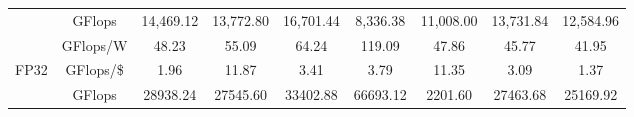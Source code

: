 \begin{table}[H]
\begin{adjustwidth}{-1.0in}{-1.0in}
\begin{center}
{\begin{tabular}{cc||c|c|c|c|c|c|c}
                                  & \cellcolor[HTML]{EFEFEF}GFlops                                                         & \cellcolor[HTML]{EFEFEF}14,469.12                               & \cellcolor[HTML]{EFEFEF}13,772.80                                & \cellcolor[HTML]{EFEFEF}16,701.44                                    & \cellcolor[HTML]{EFEFEF}8,336.38                              & \cellcolor[HTML]{EFEFEF}11,008.00                                    & \cellcolor[HTML]{EFEFEF}13,731.84                                      & \cellcolor[HTML]{EFEFEF}12,584.96                                      \\
                                  & GFlops/W                                                                               & 48.23                                                           & 55.09                                                            & 64.24                                                                & 119.09                                                        & 47.86                                                                & 45.77                                                                  & 41.95                                                                  \\
\multirow{-3}{*}{FP32}            & \cellcolor[HTML]{EFEFEF}GFlops/\$                                                      & \cellcolor[HTML]{EFEFEF}1.96                                    & \cellcolor[HTML]{EFEFEF}11.87                                    & \cellcolor[HTML]{EFEFEF}3.41                                         & \cellcolor[HTML]{EFEFEF}3.79                                  & \cellcolor[HTML]{EFEFEF}11.35                                        & \cellcolor[HTML]{EFEFEF}3.09                                           & \cellcolor[HTML]{EFEFEF}1.37                                           \\ \hline
                                  & GFlops                                                                                 & 28938.24                                                        & 27545.60                                                         & 33402.88                                                             & 66693.12                                                      & 2201.60                                                              & 27463.68                                                               & 25169.92                                                               \\

\end{tabular}}
\end{center}
\end{adjustwidth}
\end{table}
